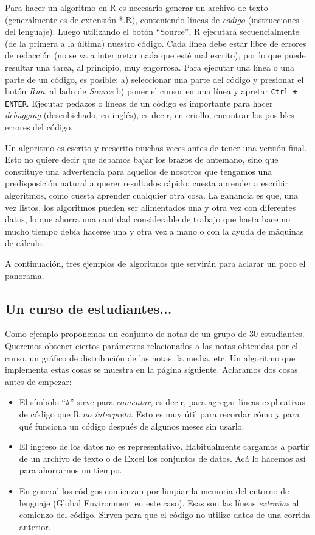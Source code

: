 \documentclass[11pt,a4paper]{article}
\begin{document}
Para hacer un algoritmo en R es necesario generar un archivo de texto (generalmente es de extensión *.R), conteniendo líneas de \textit{código} (instrucciones del lenguaje). Luego utilizando el botón ``Source'', R ejecutará secuencialmente (de la primera a la última) nuestro código. Cada línea debe estar libre de errores de redacción (no se va a interpretar nada que esté mal escrito), por lo que puede resultar una tarea, al principio, muy engorrosa. Para ejecutar una línea o una parte de un código, es posible: a) seleccionar una parte del código y presionar el botón \textit{Run}, al lado de \textit{Source} b) poner el cursor en una línea y apretar \texttt{Ctrl + ENTER}. Ejecutar pedazos o líneas de un código es importante para hacer \textit{debugging} (desenbichado, en inglés), es decir, en criollo, encontrar los posibles errores del código.

Un algoritmo es escrito y reescrito muchas veces antes de tener una versión final. Esto no quiere decir que debamos bajar los brazos de antemano, sino que constituye una advertencia para aquellos de nosotros que tengamos una predisposición natural a querer resultados rápido: cuesta aprender a escribir algoritmos, como cuesta aprender cualquier otra cosa. La ganancia es que, una vez listos, los algoritmos pueden ser alimentados una y otra vez con diferentes datos, lo que ahorra una cantidad considerable de trabajo que hasta hace no mucho tiempo debía hacerse una y otra vez a mano o con la ayuda de máquinas de cálculo.

A continuación, tres ejemplos de algoritmos que servirán para aclarar un poco el panorama.


\subsection{Un curso de estudiantes...}

Como ejemplo proponemos un conjunto de notas de un grupo de 30 estudiantes. Queremos obtener ciertos  parámetros relacionados a las notas obtenidas por el curso, un gráfico de distribución de las notas, la media, etc. Un algoritmo que implementa estas cosas se muestra en la página siguiente. Aclaramos dos cosas antes de empezar:

\begin{itemize}
\item[$\bullet$] El símbolo ``\texttt{\#}'' sirve para \textit{comentar}, es decir, para agregar líneas explicativas de código que R \textit{no interpreta}. Esto es muy útil para recordar cómo y para qué funciona un código después de algunos meses sin usarlo.
\item[$\bullet$] El ingreso de los datos no es representativo. Habitualmente cargamos a partir de un archivo de texto o de Excel los conjuntos de datos. Acá lo hacemos así para ahorrarnos un tiempo.
\item[$\bullet$] En general los códigos comienzan por limpiar la memoria del entorno de lenguaje (Global Environment en este caso). Esas son las líneas \textit{extrañas} al comienzo del código. Sirven para que el código no utilize datos de una corrida anterior.
\end{itemize}
\pagebreak
\end{document}
